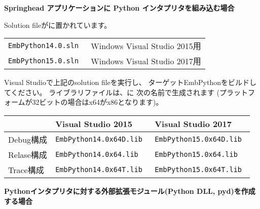 \medskip
\bf{Springhead アプリケーションに Python インタプリタを組み込む場合}

\begin{narrow}
	Solution fileがに置かれています。

	\medskip
	\begin{narrow}[10pt]
	\begin{tabular}{l@{\ \ ---\ \ }l}\hline
		\tt{EmbPython14.0.sln} & Windows Visual Studio 2015用 \\
		\tt{EmbPython15.0.sln} & Windows Visual Studio 2017用 \\\hline
	\end{tabular}
	\end{narrow}

	\medskip
	Visual Studioで上記のsolution fileを実行し、
	ターゲットEmbPythonをビルドしてください。
	ライブラリファイルは、に
	次の名前で生成されます
	(プラットフォームが32ビットの場合はx64がx86となります)。

	\medskip
	\begin{narrow}[10pt]
	\begin{tabular}{l@{\ \ ---\ \ }ll}\hline
		& Visual Studio 2015 & Visual Studio 2017 \\\hline
		Debug構成 & \tt{EmbPython14.0x64D.lib} & \tt{EmbPython15.0x64D.lib} \\
		Relase構成 & \tt{EmbPython14.0x64.lib} & \tt{EmbPython15.0x64.lib} \\
		Trace構成 & \tt{EmbPython14.0x64T.lib} & \tt{EmbPython15.0x64T.lib} \\\hline
	\end{tabular}
	\end{narrow}
	\medskip
\end{narrow}

\bigskip
\bf{Pythonインタプリタに対する外部拡張モジュール(Python DLL, pyd)を作成する場合}

